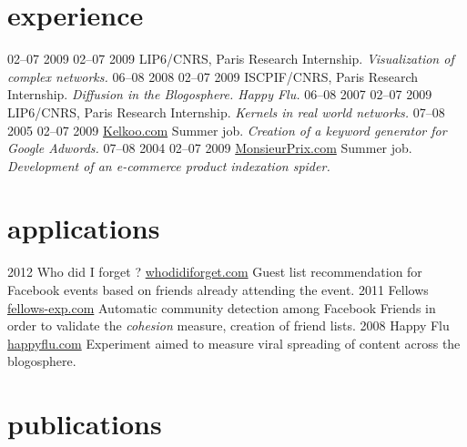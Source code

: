 \documentclass[]{roger-cv}
\begin{document}
\section{experience}

\begin{entrylist}
  \entry
    {02–07 2009}
    {02–07 2009}
    {LIP6/CNRS, Paris}
    {Research Internship.}
    {\emph{Visualization of complex networks.}}
  \entry
    {06–08 2008}
    {02–07 2009}
    {ISCPIF/CNRS, Paris}
    {Research Internship.}
    {\emph{Diffusion in the Blogosphere. Happy Flu.}}
  \entry
    {06–08 2007}
    {02–07 2009}
    {LIP6/CNRS, Paris}
    {Research Internship.}
    {\emph{Kernels in real world networks.}}
  \entry
    {07–08 2005}
    {02–07 2009}
    {\href{http://www.kelkoo.com}{Kelkoo.com}}
    {Summer job.}
    {\emph{Creation of a keyword generator for Google Adwords.}}
  \entry
    {07–08 2004}
    {02–07 2009}
    {\href{http://www.monsieurprix.com}{MonsieurPrix.com}}
    {Summer job.}
    {\emph{Development of an e-commerce product indexation spider.}}
\end{entrylist}

\section{applications}

\begin{entrylist}
  \entry
    {2012}
    {}
    {Who did I forget ?}
    {\href{http://whodidiforget.com}{whodidiforget.com}}
    {Guest list recommendation for Facebook events based on friends already attending the event.}
  \entry
    {2011}
    {}
    {Fellows}
    {\href{http://fellows-exp.com}{fellows-exp.com}}
    {Automatic community detection among Facebook Friends in order to validate the \emph{cohesion} measure, creation of friend lists.}
  \entry
    {2008}
    {}
    {Happy Flu}
    {\href{http://happyflu.com}{happyflu.com}}
    {Experiment aimed to measure viral spreading of content across the blogosphere.}
\end{entrylist}

\section{publications}


\begin{refsection}
  \nocite{*}
  \printbibliography[sorting=chronological, type=inproceedings, title={international peer-reviewed conferences/proceedings}, notkeyword={france}, heading=subbibliography]
\end{refsection}
\begin{refsection}
  \nocite{*}
  \printbibliography[sorting=chronological, type=inproceedings, title={local peer-reviewed conferences/proceedings}, keyword={france}, heading=subbibliography]
\end{refsection}
\end{document}
